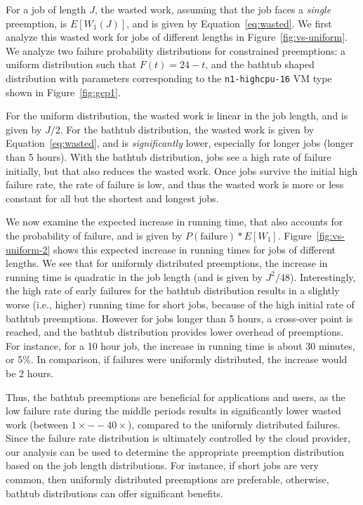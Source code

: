 For a job of length $J$, the wasted work, assuming that the job faces a \emph{single} preemption, is $E[W_1(J)]$, and is given by Equation~\ref{eq:wasted}.
We first analyze this wasted work for jobs of different lengths in Figure~\ref{fig:vs-uniform}. 
We analyze two failure probability distributions for constrained preemptions: a uniform distribution such that $F(t) = 24-t$, and the bathtub shaped distribution with parameters corresponding to the \texttt{n1-highcpu-16} VM type shown in Figure~\ref{fig:gcp1}. 


For the uniform distribution, the wasted work is linear in the job length, and is given by $J/2$.
For the bathtub distribution, the wasted work is given by Equation~\ref{eq:wasted}, and is \emph{significantly} lower, especially for longer jobs (longer than 5 hours). 
With the bathtub distribution, jobs see a high rate of failure initially, but that also reduces the wasted work. 
Once jobs survive the initial high failure rate, the rate of failure is low, and thus the wasted work is more or less constant for all but the shortest and longest jobs. 



We now examine the expected increase in running time, that also accounts for the probability of failure, and is given by $P(\text{failure})*E[W_1]$. 
Figure~\ref{fig:vs-uniform-2} shows this expected increase in running times for jobs of different lengths.
We see that for uniformly distributed preemptions, the increase in running time is quadratic in the job length (and is given by $J^2/48$). 
Interestingly, the high rate of early failures for the bathtub distribution results in a slightly worse (i.e., higher) running time for short jobs, because of the high initial rate of bathtub preemptions. 
However for jobs longer than 5 hours, a cross-over point is reached, and the bathtub distribution provides lower overhead of preemptions.
For instance, for a 10 hour job, the increase in running time is about 30 minutes, or 5\%. 
In comparison, if failures were uniformly distributed, the increase would be 2 hours. 


Thus, the bathtub preemptions are beneficial for applications and users, as the low failure rate during the middle periods results in significantly lower wasted work (between $1\times--40\times$), compared to the uniformly distributed failures.
Since the failure rate distribution is ultimately controlled by the cloud provider, our analysis can be used to determine the appropriate preemption distribution based on the job length distributions.
For instance, if short jobs are very common, then uniformly distributed preemptions are preferable, otherwise, bathtub distributions can offer significant benefits. 

